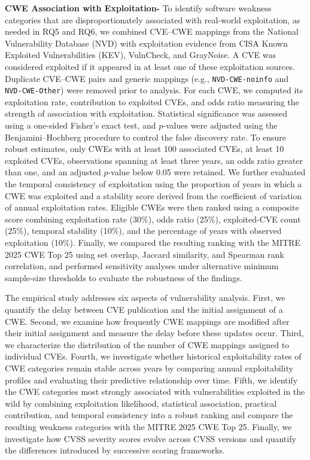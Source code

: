 \documentclass[conference,compsoc]{IEEEtran}
\begin{document}
\textbf{CWE Association with Exploitation-} To identify software weakness categories that are disproportionately associated with real-world exploitation, as needed in RQ5 and RQ6, we combined CVE--CWE mappings from the National Vulnerability Database (NVD) with exploitation evidence from CISA Known Exploited Vulnerabilities (KEV), VulnCheck, and GrayNoise. A CVE was considered exploited if it appeared in at least one of these exploitation sources. Duplicate CVE--CWE pairs and generic mappings (e.g., \texttt{NVD-CWE-noinfo} and \texttt{NVD-CWE-Other}) were removed prior to analysis. For each CWE, we computed its exploitation rate, contribution to exploited CVEs, and odds ratio measuring the strength of association with exploitation. Statistical significance was assessed using a one-sided Fisher's exact test, and $p$-values were adjusted using the Benjamini--Hochberg procedure to control the false discovery rate. To ensure robust estimates, only CWEs with at least 100 associated CVEs, at least 10 exploited CVEs, observations spanning at least three years, an odds ratio greater than one, and an adjusted $p$-value below 0.05 were retained. We further evaluated the temporal consistency of exploitation using the proportion of years in which a CWE was exploited and a stability score derived from the coefficient of variation of annual exploitation rates. Eligible CWEs were then ranked using a composite score combining exploitation rate (30\%), odds ratio (25\%), exploited-CVE count (25\%), temporal stability (10\%), and the percentage of years with observed exploitation (10\%). Finally, we compared the resulting ranking with the MITRE 2025 CWE Top 25 using set overlap, Jaccard similarity, and Spearman rank correlation, and performed sensitivity analyses under alternative minimum sample-size thresholds to evaluate the robustness of the findings.


The empirical study addresses six aspects of vulnerability analysis. First, we quantify the delay between CVE publication and the initial assignment of a CWE. Second, we examine how frequently CWE mappings are modified after their initial assignment and measure the delay before these updates occur. Third, we characterize the distribution of the number of CWE mappings assigned to individual CVEs. Fourth, we investigate whether historical exploitability rates of CWE categories remain stable across years by comparing annual exploitability profiles and evaluating their predictive relationship over time. Fifth, we identify the CWE categories most strongly associated with vulnerabilities exploited in the wild by combining exploitation likelihood, statistical association, practical contribution, and temporal consistency into a robust ranking and compare the resulting weakness categories with the MITRE 2025 CWE Top 25. Finally, we investigate how CVSS severity scores evolve across CVSS versions and quantify the differences introduced by successive scoring frameworks.
\end{document}
